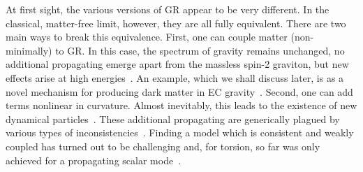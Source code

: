 \documentclass[aps,prd,reprint,preprintnumbers,showpacs,floatfix,nofootinbib,superscript address,longbibliography]{revtex4-1}
\begin{document}
 At first sight, the various versions of GR appear to be very different. In the classical, matter-free limit, however, they are all fully equivalent.
There are two main ways to break this equivalence. First, one can couple matter (non-minimally) to GR. In this case, the spectrum of gravity remains unchanged, \ie no additional propagating \dof emerge apart from the massless spin-2 graviton, but new effects arise at high energies~\cite{Freidel:2005sn,Bauer:2008zj,Poplawski:2011xf,Diakonov:2011fs,Khriplovich:2012xg,Magueijo:2012ug,Khriplovich:2013tqa,Markkanen:2017tun,Carrilho:2018ffi,Enckell:2018hmo,Rasanen:2018fom,Rubio:2019ypq,Shaposhnikov:2020geh,Karananas:2020qkp,Langvik:2020nrs,Shaposhnikov:2020gts,Mikura:2020qhc,Shaposhnikov:2020aen,Kubota:2020ehu,Enckell:2020lvn,Iosifidis:2021iuw,Racioppi:2021ynx,Cheong:2021kyc,Dioguardi:2021fmr,Piani:2022gon,Dux:2022kuk,Rasanen:2022ijc,Gialamas:2023emn,Gialamas:2023flv,Piani:2023aof,Poisson:2023tja,Rigouzzo:2023sbb}. An example, which we shall discuss later, is as a novel mechanism for producing dark matter in EC gravity~\cite{Shaposhnikov:2020aen}.  Second, one can add terms nonlinear in curvature. Almost inevitably, this leads to the existence of new dynamical particles~\cite{Stelle:1977ry,Neville:1978bk,Neville:1979rb,Sezgin:1979zf,Hayashi:1979wj, Hayashi:1980qp}. 
These additional propagating \dof are generically plagued by various types of inconsistencies~\cite{Stelle:1977ry,Neville:1978bk,Neville:1979rb,Sezgin:1979zf,Hayashi:1979wj, Hayashi:1980qp,Hecht:1990wn,Hecht:1991jh,Chen:1998ad}. 
Finding a model which is consistent and weakly coupled has turned out to be challenging and, for torsion, so far was only achieved for a propagating scalar mode~\cite{Hecht:1996np,Chen:1998ad,Yo:1999ex,Yo:2001sy}. 
\end{document}
